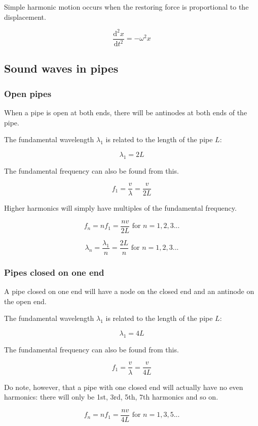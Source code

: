 \documentclass[12pt]{article}
\begin{document}
Simple harmonic motion occurs when the restoring force is proportional to the displacement.

\[
\boxed{
\frac{\mathrm{d}^2 x}{\mathrm{d}t^2} = -\omega^2 x
}
\]

\subsection{Sound waves in pipes}

\subsubsection{Open pipes}

When a pipe is open at both ends, there will be antinodes at both ends of the pipe.

The fundamental wavelength $\lambda_1$ is related to the length of the pipe $L$:

\[
\boxed{
\lambda_1 = 2L
}
\]

The fundamental frequency can also be found from this.

\[
\boxed{
f_1 = \frac{v}{\lambda} = \frac{v}{2L}
}
\]

Higher harmonics will simply have multiples of the fundamental frequency.

\[
\boxed{
f_n = nf_1 = \frac{nv}{2L}\text{ for }n = 1,2,3...
}
\]

\[
\boxed{
\lambda_n = \frac{\lambda_1}{n} = \frac{2L}{n}\text{ for }n = 1,2,3...
}
\]

\subsubsection{Pipes closed on one end}

A pipe closed on one end will have a node on the closed end and an antinode on the open end.

The fundamental wavelength $\lambda_1$ is related to the length of the pipe $L$:

\[
\boxed{
\lambda_1 = 4L
}
\]

The fundamental frequency can also be found from this.

\[
\boxed{
f_1 = \frac{v}{\lambda} = \frac{v}{4L}
}
\]

Do note, however, that a pipe with one closed end will actually have no even harmonics: there will only be 1st, 3rd, 5th, 7th harmonics and so on.

\[
\boxed{
f_n = nf_1 = \frac{nv}{4L}\text{ for }n = 1,3,5...
}
\]
\end{document}
